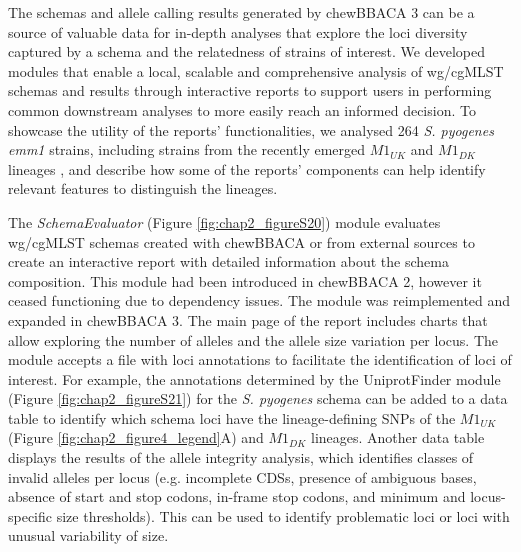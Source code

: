 The schemas and allele calling results generated by chewBBACA 3 can be a source of valuable data for in-depth analyses that explore the loci diversity captured by a schema and the relatedness of strains of interest. We developed modules that enable a local, scalable and comprehensive analysis of \ac{wg/cgMLST} schemas and results through interactive reports to support users in performing common downstream analyses to more easily reach an informed decision. To showcase the utility of the reports' functionalities, we analysed 264 \textit{S. pyogenes} \textit{emm1} strains, including strains from the recently emerged $M1_{UK}$ and $M1_{DK}$ lineages \citep{lynskey_emergence_2019, johannesen_increase_2023}, and describe how some of the reports’ components can help identify relevant features to distinguish the lineages.

The \textit{SchemaEvaluator} (Figure \ref{fig:chap2_figureS20}) module evaluates \ac{wg/cgMLST} schemas created with chewBBACA or from external sources to create an interactive report with detailed information about the schema composition. This module had been introduced in chewBBACA 2, however it ceased functioning due to dependency issues. The module was reimplemented and expanded in chewBBACA 3. The main page of the report includes charts that allow exploring the number of alleles and the allele size variation per locus. The module accepts a file with loci annotations to facilitate the identification of loci of interest. For example, the annotations determined by the UniprotFinder module (Figure \ref{fig:chap2_figureS21}) for the \textit{S. pyogenes} schema can be added to a data table to identify which schema loci have the lineage-defining \ac{SNPs} of the $M1_{UK}$ (Figure \ref{fig:chap2_figure4_legend}A) and $M1_{DK}$ lineages. Another data table displays the results of the allele integrity analysis, which identifies classes of invalid alleles per locus (e.g. incomplete \ac{CDSs}, presence of ambiguous bases, absence of start and stop codons, in-frame stop codons, and minimum and locus-specific size thresholds). This can be used to identify problematic loci or loci with unusual variability of size.

